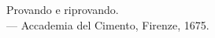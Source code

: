 \thispagestyle{empty}

\vspace*{3cm}

\begin{center}
    Provando e riprovando. \\ \medskip
    --- Accademia del Cimento, Firenze, 1675.
\end{center}
